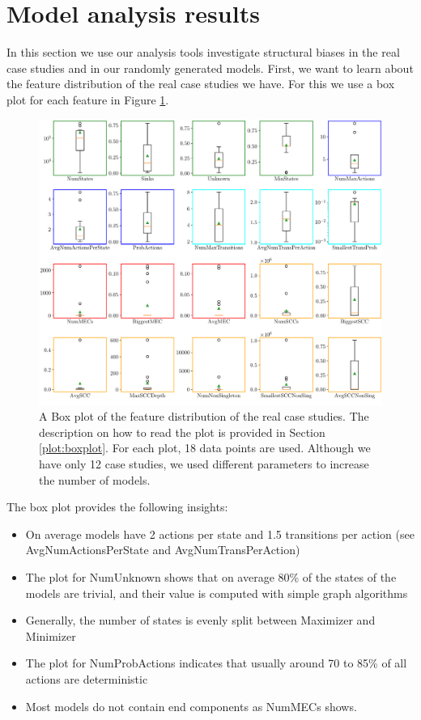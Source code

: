 \section{Model analysis results}
In this section we use our analysis tools investigate structural biases in the real case studies and in our randomly generated models.
First, we want to learn about the feature distribution of the real case studies we have. 
For this we use a box plot for each feature in Figure \ref{fig:Real_FeatureDistribution}.
\begin{figure}[h!]
    \centering
    \includegraphics[width=1\textwidth]{figures/Real_FeatureDistribution.pdf}
    \caption[Feature Distribution of the case studies]{
        A Box plot of the feature distribution of the real case studies.
        The description on how to read the plot is provided in Section \ref{plot:boxplot}.
        For each plot, 18 data points are used. 
        Although we have only 12 case studies, we used different parameters to increase the number of models. 
    }
    \label{fig:Real_FeatureDistribution}
\end{figure}
The box plot provides the following insights:
\begin{itemize} \label{insights:realDistribution}
    \item On average models have 2 actions per state and 1.5 transitions per action (see AvgNumActionsPerState and AvgNumTransPerAction)
    \item The plot for NumUnknown shows that on average 80\% of the states of the models are trivial, and their value is computed with simple graph algorithms 
    \item Generally, the number of states is evenly split between Maximizer and Minimizer
    \item The plot for NumProbActions indicates that usually around 70 to 85\% of all actions are deterministic
    \item Most models do not contain end components as NumMECs shows.
\end{itemize}

